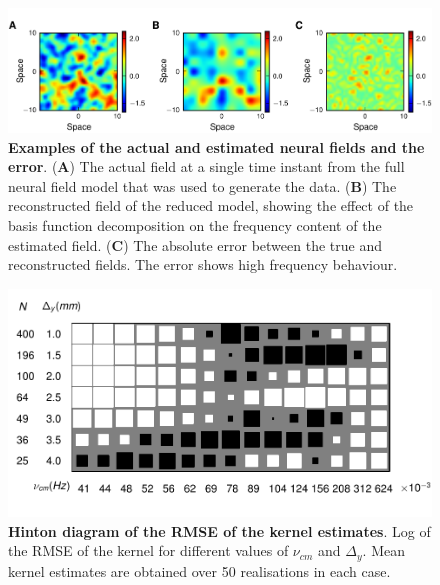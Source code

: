 \documentclass[12pt]{iopart}
\begin{document}
\begin{figure}[!ht]
\begin{center}
\includegraphics{./Graph/pdf/Figure10.pdf}
\end{center}
\caption{{\bf Examples of the actual and estimated neural fields and the error}. (\textbf{A}) The actual field at a single time instant from the full neural field model that was used to generate the data. (\textbf{B}) The reconstructed field of the reduced model, showing the effect of the basis function decomposition on the frequency content of the estimated field. (\textbf{C}) The absolute error between the true and reconstructed fields. The error shows high frequency behaviour.}
\label{fig:Figure10}
\end{figure}

\begin{figure}[!ht]
\begin{center}
\includegraphics{./Graph/pdf/Figure11.pdf}
\end{center}
\caption{{\bf Hinton diagram of the RMSE of the kernel estimates}. Log of the RMSE of the kernel for different values of $\nu_{cm}$ and $\Delta_y$. Mean kernel estimates are obtained over 50 realisations in each case.}
\label{fig:Figure11}
\end{figure}
\end{document}
